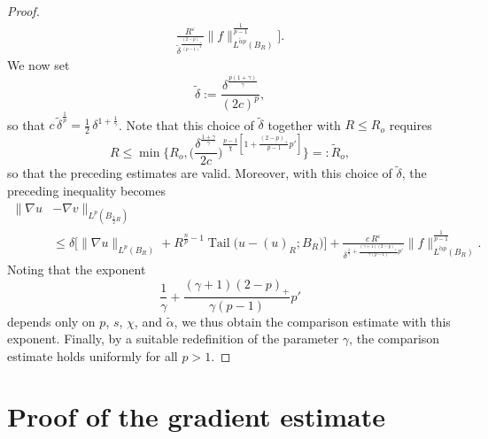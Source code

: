 \documentclass[10pt,letterpaper]{amsart}
\theoremstyle{definition}
\numberwithin{theorem}{section}
\numberwithin{equation}{section}
\newcommand{\1}{\ensuremath{\mathds{1}}}
\renewcommand{\epsilon}{\varepsilon}
\renewcommand{\epsilon}{\varepsilon}
\DeclareMathOperator{\Tail}{Tail}
\numberwithin{equation}{section}
\begin{document}
\begin{proof}
\begin{align*}
     \frac{R^\epsilon}{\tilde\delta^{\frac{(2-p)_+}{(p-1)^2}}} 
    \|f\|_{L^{\tilde\alpha p}(B_R)}^{\frac{1}{p-1}} \bigg] .
\end{align*}
We now set
\[
\tilde\delta :=  \frac{\delta^{\frac{p(1+\gamma)}{\gamma}} }{(2c)^{p}},
\]
so that
$
c\, \tilde\delta^{\frac{1}{p}} = \tfrac12 \, \delta^{1+\frac{1}{\gamma}}$. 
Note that this choice of $\tilde\delta$ together with $R \leq R_o$ requires
\[
R \le \min\Bigg\{R_o,
\bigg(\frac{\delta^{\frac{1+\gamma}{\gamma}}}{2c}\bigg)^{\frac{p-1}{\chi} \left[ 1 + \frac{(2-p)_+}{p-1}p' \right]} \Bigg\}
=: \widetilde R_o,
\]
so that the preceding estimates are valid. Moreover, with this choice of $\tilde\delta$, the preceding inequality becomes
\begin{align*}
    \|\nabla u &- \nabla v\|_{L^p(B_{\frac12 R})} \\
    &\le 
    \delta \Big[ 
    \| \nabla u \|_{L^{p}(B_R)} +  
    R^{\frac{n}{p}-1} \Tail \big(u-(u)_{R}; B_R\big) \Big] 
    +
     \frac{c\,R^\epsilon}{\delta^{\frac{1}{\gamma} + \frac{(\gamma + 1)(2-p)_+}{\gamma(p-1)}p'}}
    \|f\|_{L^{\tilde\alpha p}(B_R)}^{\frac{1}{p-1}}.
\end{align*}
Noting that the exponent
\[
\frac{1}{\gamma} + \frac{(\gamma + 1)(2-p)_+}{\gamma(p-1)}p'
\]
depends only on $p$, $s$, $\chi$, and $\tilde\alpha$, we thus obtain the comparison estimate with this exponent.
Finally, by a suitable redefinition of the parameter $\gamma$, the comparison estimate holds uniformly for all $p>1$.
\end{proof}


\section{Proof of the gradient estimate}\label{sec:proof}
\end{document}
